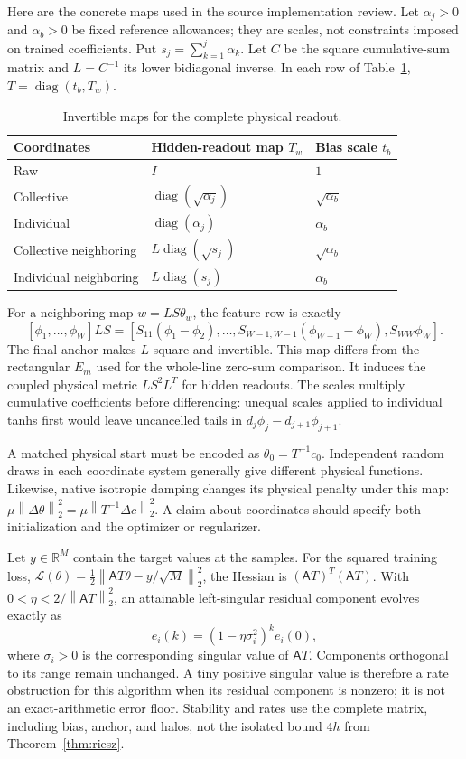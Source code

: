 \documentclass[11pt]{article}
\theoremstyle{remark}
\newcommand{\R}{\mathbb R}
\newcommand{\diag}{\operatorname{diag}}
\newcommand{\norm}[1]{\left\lVert #1\right\rVert}
\begin{document}
Here are the concrete maps used in the source implementation review.
Let $\alpha_j>0$ and $\alpha_b>0$ be fixed reference allowances; they
are scales, not constraints imposed on trained coefficients.  Put
$s_j=\sum_{k=1}^j\alpha_k$.  Let $C$ be the square cumulative-sum
matrix and $L=C^{-1}$ its lower bidiagonal inverse.  In each row of
Table~\ref{tab:maps}, $T=\diag(t_b,T_w)$.
\begin{table}[ht]
\centering
\caption{Invertible maps for the complete physical readout.}
\label{tab:maps}
\begin{tabular}{lll}
\toprule
Coordinates & Hidden-readout map $T_w$ & Bias scale $t_b$\\
\midrule
Raw & $I$ & $1$\\
Collective & $\diag(\sqrt{\alpha_j})$ & $\sqrt{\alpha_b}$\\
Individual & $\diag(\alpha_j)$ & $\alpha_b$\\
Collective neighboring & $L\diag(\sqrt{s_j})$ & $\sqrt{\alpha_b}$\\
Individual neighboring & $L\diag(s_j)$ & $\alpha_b$\\
\bottomrule
\end{tabular}
\end{table}

For a neighboring map $w=LS\theta_w$, the feature row is exactly
\[
 [\phi_1,\ldots,\phi_W]LS
 =[S_{11}(\phi_1-\phi_2),\ldots,
 S_{W-1,W-1}(\phi_{W-1}-\phi_W),S_{WW}\phi_W].
\]
The final anchor makes $L$ square and invertible.  This map differs
from the rectangular $E_m$ used for the whole-line zero-sum comparison.
It induces the coupled physical metric $LS^2L^T$ for hidden readouts.
The scales multiply cumulative coefficients before differencing:
unequal scales applied to individual tanhs first would leave uncancelled
tails in $d_j\phi_j-d_{j+1}\phi_{j+1}$.

A matched physical start must be encoded as
$\theta_0=T^{-1}c_0$.  Independent random draws in each coordinate
system generally give different physical functions.  Likewise, native
isotropic damping changes its physical penalty under this map:
$\mu\norm{\Delta\theta}_2^2
=\mu\norm{T^{-1}\Delta c}_2^2$.  A claim about coordinates should
specify both initialization and the optimizer or regularizer.

Let $y\in\R^M$ contain the target values at the samples. For the squared training loss,
$\mathcal L(\theta)=\tfrac12\norm{\mathsf AT\theta-y/\sqrt M}_2^2$,
the Hessian is $(\mathsf AT)^T(\mathsf AT)$.  With
$0<\eta<2/\norm{\mathsf AT}_2^2$, an attainable left-singular residual
component evolves exactly as
\begin{equation}\label{eq:rate}
 e_i(k)=(1-\eta\sigma_i^2)^k e_i(0),
\end{equation}
where $\sigma_i>0$ is the corresponding singular value of
$\mathsf AT$.  Components orthogonal to its range remain unchanged.
A tiny positive singular value is therefore a rate obstruction for
this algorithm when its residual component is nonzero; it is not an
exact-arithmetic error floor.  Stability and rates use the complete
matrix, including bias, anchor, and halos, not the isolated bound
$4h$ from Theorem~\ref{thm:riesz}.
\end{document}
